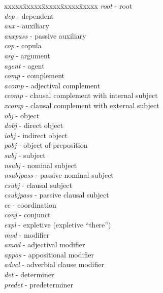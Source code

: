 \documentclass[11pt,letterpaper]{article}
\begin{document}
\begin{tabbing}
xxxxx\= xxxxx\= xxxxx\= xxxxx\= xxxxx \kill
\emph{root} - root\\
\emph{dep} - dependent \\
 \> \emph{aux} - auxiliary \\
 \> \> \emph{auxpass} - passive auxiliary\\
 \> \> \emph{cop} - copula\\
 \> \emph{arg} - argument \\
   \> \> \emph{agent} - agent\\
    \> \> \emph{comp} - complement \\
	  \> \> \> \emph{acomp} - adjectival complement \\
	  \> \> \> \emph{ccomp} - clausal complement with internal subject \\
      \> \> \> \emph{xcomp} -  clausal complement with external subject\\
      \> \> \> \emph{obj} - object \\
        \> \> \> \> \emph{dobj} - direct object \\
        \> \> \> \> \emph{iobj} - indirect object \\
        \> \> \> \> \emph{pobj} - object of preposition \\
	\> \>  \emph{subj} - subject \\
	      \> \> \> \emph{nsubj} - nominal subject \\
	        \> \> \> \> \emph{nsubjpass} - passive nominal subject \\
	      \> \> \> \emph{csubj} - clausal subject \\
		  \> \> \> \> \emph{csubjpass} - passive clausal subject \\
 \> \emph{cc} - coordination \\
 \> \emph{conj} - conjunct \\
 \> \emph{expl} - expletive (expletive ``there'') \\
 \> \emph{mod} - modifier \\
    \> \> \emph{amod} - adjectival modifier \\
    \> \> \emph{appos} - appositional modifier \\
    \> \> \emph{advcl} - adverbial clause modifier \\
    \> \> \emph{det} - determiner \\
    \> \> \emph{predet} - predeterminer\\

\end{tabbing}
\end{document}
